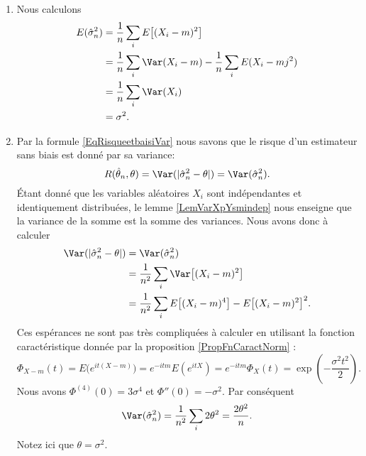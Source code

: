 \begin{example}
    \begin{enumerate}
        \item
            Nous calculons
            \begin{equation}
                \begin{aligned}[]
                    E(\hat\sigma_n^2)&=\frac{1}{ n }\sum_i E\big[ (X_i-m)^2 \big]\\
                    &=\frac{1}{ n }\sum_i\Var(X_i-m)-\frac{1}{ n }\sum_iE(X_i-mj^2)\\
                    &=\frac{1}{ n }\sum_i\Var(X_i)\\
                    &=\sigma^2.
                \end{aligned}
            \end{equation}
        \item
            Par la formule \eqref{EqRisqueetbaisiVar} nous savons que le risque d'un estimateur sans biais est donné par sa variance:
            \begin{equation}
                R(\hat\theta_n,\theta)=\Var(| \hat\sigma_n^2-\theta |)=\Var(\hat\sigma_n^2).
            \end{equation}
            Étant donné que les variables aléatoires \( X_i\) sont indépendantes et identiquement distribuées, le lemme \ref{LemVarXpYsmindep} nous enseigne que la variance de la somme est la somme des variances. Nous avons donc à calculer
            \begin{equation}
                \begin{aligned}[]
                    \Var(| \hat\sigma_n^2-\theta |)&=\Var(\hat\sigma_n^2)\\
                    &=\frac{1}{ n^2 }\sum_i\Var\big[ (X_i-m)^2 \big]\\
                    &=\frac{1}{ n^2 }\sum_i E\big[ (X_i-m)^4 \big]-E\big[ (X_i-m)^2 \big]^2.
                \end{aligned}
            \end{equation}
            Ces espérances ne sont pas très compliquées à calculer en utilisant la fonction caractéristique donnée par la proposition \ref{PropFnCaractNorm} :
            \begin{equation}
                \Phi_{X-m}(t)= E\big(  e^{it(X-m)} \big)= e^{-itm}E( e^{itX})= e^{-itm}\Phi_X(t)= \exp\left( -\frac{ \sigma^2t^2 }{2} \right).
            \end{equation}
            Nous avons \( \Phi^{(4)}(0)=3\sigma^4\) et \( \Phi''(0)=-\sigma^2\). Par conséquent
            \begin{equation}
                \Var(\hat\sigma_n^2)=\frac{1}{ n^2 }\sum_i2\theta^2=\frac{ 2\theta^2 }{ n }.
            \end{equation}
            Notez ici que \( \theta=\sigma^2\).


\end{enumerate}
\end{example}
